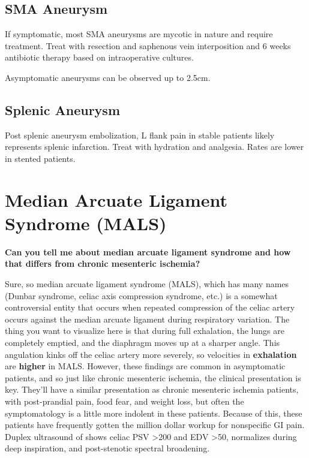 \documentclass[
]{book}
\begin{document}
\hypertarget{sma-aneurysm}{%
\subsection{SMA Aneurysm}\label{sma-aneurysm}}

If symptomatic, most SMA aneurysms are mycotic in nature and require
treatment. Treat with resection and saphenous vein interposition and 6
weeks antibiotic therapy based on intraoperative
cultures.\citep{leeInfectedMycoticAneurysms2008}

Asymptomatic aneurysms can be observed up to
2.5cm.\citep{kwong85SplanchnicArtery, stoneSuperiorMesentericArtery2002}

\hypertarget{splenic-aneurysm}{%
\subsection{Splenic Aneurysm}\label{splenic-aneurysm}}

Post splenic aneurysm embolization, L flank pain in stable patients
likely represents splenic infarction. Treat with hydration and
analgesia. Rates are lower in stented
patients.\citep{kwong85SplanchnicArtery, piffarettiSplenicArteryAneurysms2007, zhuEndovascularSurgicalManagement2019}

\hypertarget{median-arcuate-ligament-syndrome-mals}{%
\section{Median Arcuate Ligament Syndrome (MALS)}\label{median-arcuate-ligament-syndrome-mals}}

\textbf{Can you tell me about median arcuate ligament syndrome and how that
differs from chronic mesenteric ischemia?}

Sure, so median arcuate ligament syndrome (MALS), which has many names
(Dunbar syndrome, celiac axis compression syndrome, etc.) is a somewhat
controversial entity that occurs when repeated compression of the celiac
artery occurs against the median arcuate ligament during respiratory
variation. The thing you want to visualize here is that during full
exhalation, the lungs are completely emptied, and the diaphragm moves up
at a sharper angle. This angulation kinks off the celiac artery more
severely, so velocities in \textbf{exhalation} are \textbf{higher} in MALS.
However, these findings are common in asymptomatic patients, and so just
like chronic mesenteric ischemia, the clinical presentation is key.
They'll have a similar presentation as chronic mesenteric ischemia
patients, with post-prandial pain, food fear, and weight loss, but often
the symptomatology is a little more indolent in these patients. Because
of this, these patients have frequently gotten the million dollar workup
for nonspecific GI pain. Duplex ultrasound of shows celiac PSV \textgreater200 and
EDV \textgreater50, normalizes during deep inspiration, and post-stenotic spectral
broadening.\citep{zwolakMesentericCeliacDuplex1998}
\end{document}
